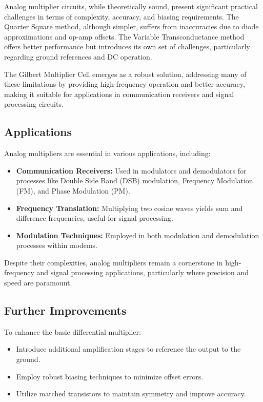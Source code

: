 Analog multiplier circuits, while theoretically sound, present significant practical challenges in terms of complexity, accuracy, and biasing requirements. The Quarter Square method, although simpler, suffers from inaccuracies due to diode approximations and op-amp offsets. The Variable Transconductance method offers better performance but introduces its own set of challenges, particularly regarding ground references and DC operation.

The Gilbert Multiplier Cell emerges as a robust solution, addressing many of these limitations by providing high-frequency operation and better accuracy, making it suitable for applications in communication receivers and signal processing circuits.

\subsection{Applications}

Analog multipliers are essential in various applications, including:

\begin{itemize}
    \item \textbf{Communication Receivers:} Used in modulators and demodulators for processes like Double Side Band (DSB) modulation, Frequency Modulation (FM), and Phase Modulation (PM).
    \item \textbf{Frequency Translation:} Multiplying two cosine waves yields sum and difference frequencies, useful for signal processing.
    \item \textbf{Modulation Techniques:} Employed in both modulation and demodulation processes within modems.
\end{itemize}

Despite their complexities, analog multipliers remain a cornerstone in high-frequency and signal processing applications, particularly where precision and speed are paramount.

\subsection{Further Improvements}

To enhance the basic differential multiplier:

\begin{itemize}
    \item Introduce additional amplification stages to reference the output to the ground.
    \item Employ robust biasing techniques to minimize offset errors.
    \item Utilize matched transistors to maintain symmetry and improve accuracy.
\end{itemize}


